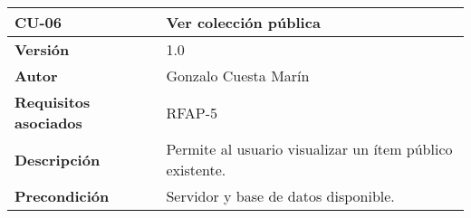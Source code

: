 \begin{longtable}[]{@{}ll@{}}
\toprule
\begin{minipage}[b]{0.25\columnwidth}\raggedright
\textbf{CU-06}\strut
\end{minipage} & \begin{minipage}[b]{0.69\columnwidth}\raggedright
\textbf{Ver colección pública}\strut
\end{minipage}\tabularnewline
\midrule
\endhead
\begin{minipage}[t]{0.25\columnwidth}\raggedright
\textbf{Versión}\strut
\end{minipage} & \begin{minipage}[t]{0.69\columnwidth}\raggedright
1.0\strut
\end{minipage}\tabularnewline
\begin{minipage}[t]{0.25\columnwidth}\raggedright
\textbf{Autor}\strut
\end{minipage} & \begin{minipage}[t]{0.69\columnwidth}\raggedright
Gonzalo Cuesta Marín\strut
\end{minipage}\tabularnewline
\begin{minipage}[t]{0.25\columnwidth}\raggedright
\textbf{Requisitos asociados}\strut
\end{minipage} & \begin{minipage}[t]{0.69\columnwidth}\raggedright
RFAP-5\strut
\end{minipage}\tabularnewline
\begin{minipage}[t]{0.25\columnwidth}\raggedright
\textbf{Descripción}\strut
\end{minipage} & \begin{minipage}[t]{0.69\columnwidth}\raggedright
Permite al usuario visualizar un ítem público existente.\strut
\end{minipage}\tabularnewline
\begin{minipage}[t]{0.25\columnwidth}\raggedright
\textbf{Precondición}\strut
\end{minipage} & \begin{minipage}[t]{0.69\columnwidth}\raggedright
Servidor y base de datos disponible.


\end{minipage}
\end{longtable}

